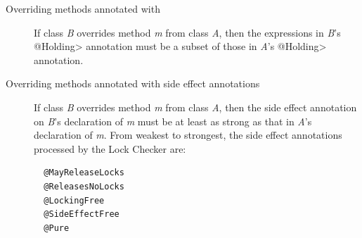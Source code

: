 \begin{description}

\item[Overriding methods annotated with ]
  If class \textit{B} overrides method \textit{m} from class \textit{A}, then the expressions in
  \textit{B}'s \<@Holding>
  annotation must be a subset of those in \textit{A}'s \<@Holding>
  annotation.

\item[Overriding methods annotated with side effect annotations]
  If class \textit{B} overrides method \textit{m} from class \textit{A}, then
  the side effect annotation on \textit{B}'s declaration of \textit{m}
  must be at least as strong as that in \textit{A}'s declaration of \textit{m}.
  From weakest to strongest, the side effect annotations
  processed by the Lock Checker are:
\begin{verbatim}
  @MayReleaseLocks
  @ReleasesNoLocks
  @LockingFree
  @SideEffectFree
  @Pure
\end{verbatim}

\end{description}


